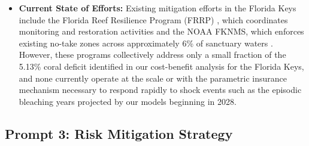 \documentclass[10pt,letterpaper]{article}
\newcounter{metric}
\begin{document}
\begin{itemize}
    \item \textbf{Current State of Efforts:} Existing mitigation efforts in the Florida Keys include the Florida Reef Resilience Program (FRRP) \cite{frrp}, which coordinates monitoring and restoration activities and the NOAA FKNMS, which enforces existing no-take zones across approximately 6\% of sanctuary waters \cite{noaa_fknms}. However, these programs collectively address only a small fraction of the 5.13\% coral deficit identified in our cost-benefit analysis for the Florida Keys, and none currently operate at the scale or with the parametric insurance mechanism necessary to respond rapidly to shock events such as the episodic bleaching years projected by our models beginning in 2028.

\end{itemize}

\subsection*{Prompt 3: Risk Mitigation Strategy}
\end{document}
